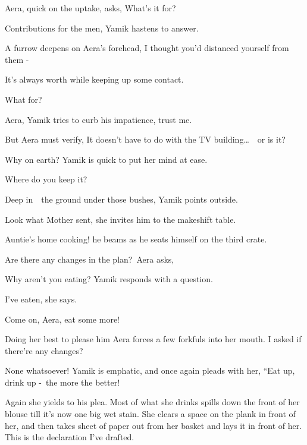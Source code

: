 \documentclass[letterpaper]{article}
\begin{document}
Aera, quick on the uptake, asks, {\textquotedbl}What's it for?{\textquotedbl} 

{\textquotedbl}Contributions for the men,{\textquotedbl} Yamik hastens to answer. 

A furrow deepens on Aera's forehead, {\textquotedbl}I thought you'd distanced yourself from them -{\textquotedbl} 

{\textquotedbl}It's always worth while keeping up some contact.{\textquotedbl} 

{\textquotedbl}What for?{\textquotedbl} 

{\textquotedbl}Aera,{\textquotedbl} Yamik tries to curb his impatience, {\textquotedbl}trust me.{\textquotedbl} 

But Aera must verify, {\textquotedbl}It doesn't have to do with the TV building{\dots}\ \ or is it?{\textquotedbl} 

{\textquotedbl}Why on earth?{\textquotedbl} Yamik is quick to put her mind at ease. ~

{\textquotedbl}Where do you keep it?{\textquotedbl} 

{\textquotedbl}Deep in\ \ the ground under those bushes,{\textquotedbl} Yamik points outside.

{\textquotedbl}Look what Mother sent,{\textquotedbl} she invites him to the makeshift table. 

{\textquotedbl}Auntie's home cooking!{\textquotedbl} he beams as he seats himself on the third crate. 

{\textquotedbl}Are there any changes in the plan?{\textquotedbl}~Aera asks,

{\textquotedbl}Why aren't you eating?{\textquotedbl} Yamik responds with a question. 

{\textquotedbl}I've eaten,{\textquotedbl} she says. ~

{\textquotedbl}Come on, Aera, eat some more!{\textquotedbl}\ \ 

Doing her best to please him Aera forces a few forkfuls into her mouth. {\textquotedbl}I asked if there're any
changes?{\textquotedbl}

{\textquotedbl}None whatsoever!{\textquotedbl} Yamik is emphatic, and once again pleads with her, ``Eat up, drink up
-\textcolor{red}{\ }the more the better!{\textquotedbl} 

Again she yields to his plea. Most of what she drinks spills down the front of her blouse till it's now one big wet
stain. She clears a space on the plank in front of her, and then takes sheet of paper out from her basket and lays it
in front of her. {\textquotedbl}This is the declaration I've drafted.{\textquotedbl}
\end{document}
